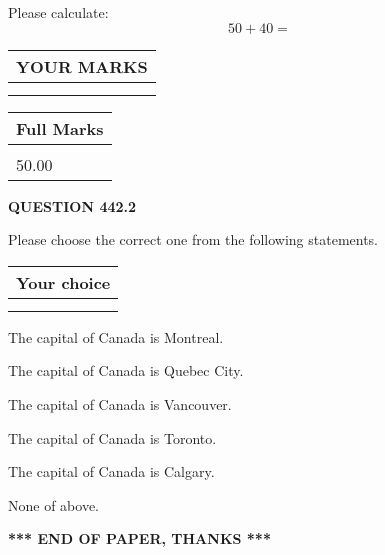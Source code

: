 \documentclass[12pt]{article}
\begin{document}
  
 
Please calculate:
\begin{equation}
50 +  %
40 = \nonumber
\end{equation}
 

 

 
  
\vspace{0.2in}
  
\noindent\begin{tabular}{|l|}
\hline
 YOUR MARKS  \\
\hline
 \\ 
 \\ 
\hline
\end{tabular}
\hspace{0.05in} \begin{tabular}{|l|}
\hline
 Full Marks  \\
\hline
 \\ 
50.00 \\
\hline
\end{tabular}
{\textbf{\Large{QUESTION
442.2 
}}}
  
  
Please choose the correct one from the following statements.
  
  
\noindent\hspace{3.0in} \begin{tabular}{|l|}
\hline
Your choice \\
\hline
 \\ 
 \\ 
\hline
\end{tabular}
  
  
 
 
The capital of Canada is Montreal.
 
 
The capital of Canada is Quebec City.
 
 
The capital of Canada is Vancouver.
 
 
The capital of Canada is Toronto.
 
 
The capital of Canada is Calgary.
 
 
 None of above.
 
 
   
   
 \vspace{0.2in}
 
   
   
   
   
\vspace{1.0in} 
{\textbf{\large{ *** END OF PAPER, THANKS *** }}} 
   
\end{document}

